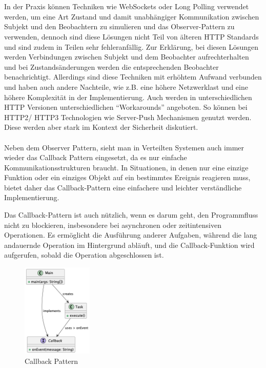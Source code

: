 \documentclass[../vs-script-first-v01.tex]{subfiles}
\begin{document}
\\\\
In der Praxis können Techniken wie WebSockets oder Long Polling verwendet werden, um eine Art Zustand und damit unabhängiger Kommunikation zwischen Subjekt und den Beobachtern zu simulieren und das Observer-Pattern zu verwenden, dennoch sind diese Lösungen nicht Teil von älteren HTTP Standards und sind zudem in Teilen sehr fehleranfällig. Zur Erklärung, bei diesen Lösungen werden Verbindungen zwischen Subjekt und dem Beobachter aufrechterhalten und bei Zustandsänderungen werden die entsprechenden Beobachter benachrichtigt. Allerdings sind diese Techniken mit erhöhtem Aufwand verbunden und haben auch andere Nachteile, wie z.B. eine höhere Netzwerklast und eine höhere Komplexität in der Implementierung. 
Auch werden in unterschiedlichen HTTP Versionen unterschiedlichen \enquote{Workarounds} angeboten. So können bei HTTP2/ HTTP3 Technologien wie Server-Push Mechanismen genutzt werden. Diese werden aber stark im Kontext der Sicherheit diskutiert. 
\\\\
Neben dem Observer Pattern, sieht man in Verteilten Systemen auch immer wieder das Callback Pattern eingesetzt, da es nur einfache Kommunikationsstrukturen braucht. In Situationen, in denen nur eine einzige Funktion oder ein einziges Objekt auf ein bestimmtes Ereignis reagieren muss, bietet daher das Callback-Pattern eine einfachere und leichter verständliche Implementierung.

Das Callback-Pattern ist auch nützlich, wenn es darum geht, den Programmfluss nicht zu blockieren, insbesondere bei asynchronen oder zeitintensiven Operationen. Es ermöglicht die Ausführung anderer Aufgaben, während die lang andauernde Operation im Hintergrund abläuft, und die Callback-Funktion wird aufgerufen, sobald die Operation abgeschlossen ist.
\begin{figure}[htb]
  \centering
  \includegraphics[width=0.30\textwidth]{fig/uml/callback-class.png}
  \caption{Callback Pattern}
  \label{fig:callback-class}
\end{figure}
\end{document}
